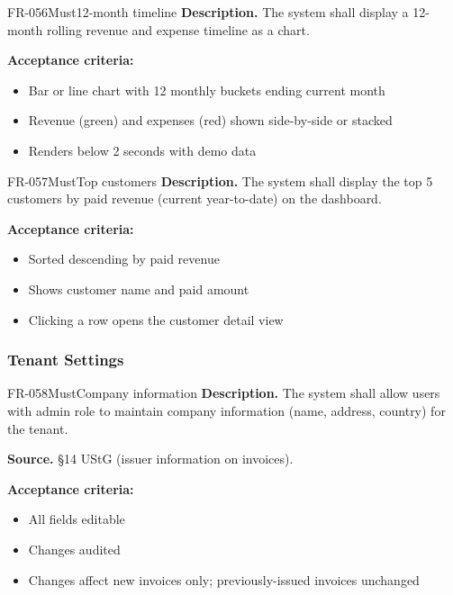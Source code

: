 \documentclass[11pt,a4paper]{article}
\begin{document}
\begin{requirement}{FR-056}{Must}{12-month timeline}
\textbf{Description.} The system shall display a 12-month rolling revenue and expense timeline as a chart.

\textbf{Acceptance criteria:}
\begin{itemize}
    \item Bar or line chart with 12 monthly buckets ending current month
    \item Revenue (green) and expenses (red) shown side-by-side or stacked
    \item Renders below 2 seconds with demo data
\end{itemize}
\end{requirement}

\begin{requirement}{FR-057}{Must}{Top customers}
\textbf{Description.} The system shall display the top 5 customers by paid revenue (current year-to-date) on the dashboard.

\textbf{Acceptance criteria:}
\begin{itemize}
    \item Sorted descending by paid revenue
    \item Shows customer name and paid amount
    \item Clicking a row opens the customer detail view
\end{itemize}
\end{requirement}

\subsubsection{Tenant Settings}

\begin{requirement}{FR-058}{Must}{Company information}
\textbf{Description.} The system shall allow users with admin role to maintain company information (name, address, country) for the tenant.

\textbf{Source.} \S14 UStG (issuer information on invoices).

\textbf{Acceptance criteria:}
\begin{itemize}
    \item All fields editable
    \item Changes audited
    \item Changes affect new invoices only; previously-issued invoices unchanged
\end{itemize}
\end{requirement}
\end{document}
